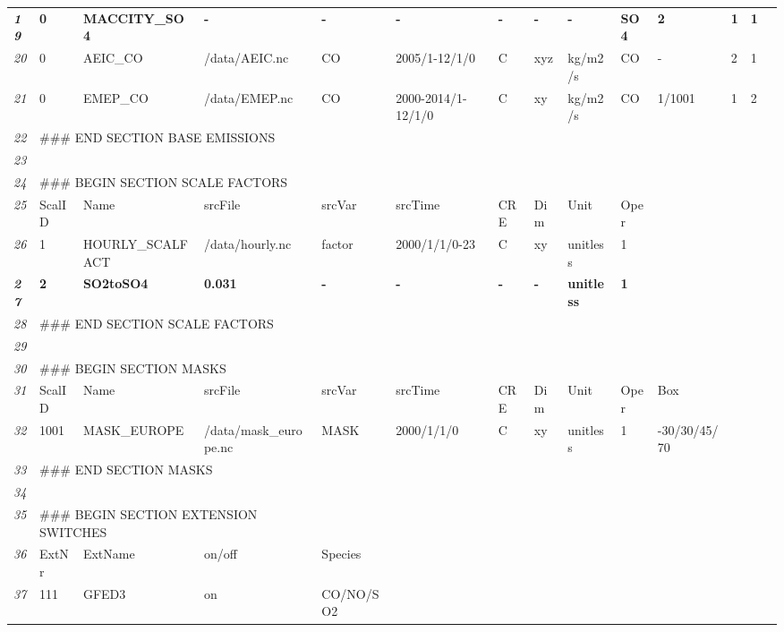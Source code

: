 \documentclass[12pt,a4paper]{article} %
\begin{document}
\begin{small}
\begin{scriptsize}
\begin{tabular}{l|lllllllllllll}
    \textit{\textbf{19}} & \textbf{0} & \textbf{MACCITY\_SO4} & \textbf{-} & \textbf{-} & \textbf{-} & \textbf{-} & \textbf{-} & \textbf{-} & \textbf{SO4} & \textbf{2} & \textbf{1} & \textbf{1} \\
    \textit{20} & 0 & AEIC\_CO & /data/AEIC.nc & CO & 2005/1-12/1/0 & C & xyz & kg/m2/s & CO & - & 2 & 1 \\
    \textit{21} & 0 & EMEP\_CO & /data/EMEP.nc & CO & 2000-2014/1-12/1/0 & C & xy & kg/m2/s & CO & 1/1001 & 1 & 2 \\
    \textit{22} & \multicolumn{3}{l}{\#\#\# END SECTION BASE EMISSIONS} & & & & & & & & & & \\  
    \textit{23} & & & & & & & & & & & & &\\
    \textit{24} & \multicolumn{3}{l}{\#\#\# BEGIN SECTION SCALE FACTORS} & & & & & & & & & & \\ 
    \textit{25} & ScalID & Name & srcFile & srcVar & srcTime & CRE & Dim & Unit & Oper & & & \\ 
    \textit{26} & 1 & HOURLY\_SCALFACT   & /data/hourly.nc & factor & 2000/1/1/0-23 & C & xy & unitless & 1 & & & \\
    \textit{\textbf{27}} & \textbf{2} & \textbf{SO2toSO4} & \textbf{0.031} & \textbf{-} & \textbf{-} & \textbf{-} & \textbf{-} & \textbf{unitless} & \textbf{1} & & & \\
    \textit{28} & \multicolumn{3}{l}{\#\#\# END SECTION SCALE FACTORS} & & & & & & & & & & \\
    \textit{29} & & & & & & & & & & & & & \\
    \textit{30} & \multicolumn{3}{l}{\#\#\# BEGIN SECTION MASKS} & & & & & & & & & & \\
    \textit{31} & ScalID & Name & srcFile & srcVar & srcTime & CRE & Dim & Unit & Oper & Box & & \\ 
    \textit{32} & 1001 & MASK\_EUROPE & /data/mask\_europe.nc & MASK & 2000/1/1/0 & C & xy & unitless & 1 & -30/30/45/70 & & \\
    \textit{33} & \multicolumn{3}{l}{\#\#\# END SECTION MASKS} & & & & & & & & & & \\
    \textit{34} & & & & & & & & & & & & & \\
    \textit{35} & \multicolumn{3}{l}{\#\#\# BEGIN SECTION EXTENSION SWITCHES} & & & & & & & & & & \\
    \textit{36} & ExtNr & ExtName & on/off & Species & & & & & & & & \\
    \textit{37} & 111 & GFED3 & on & CO/NO/SO2 & & & & & & & & \\

\end{tabular}
\end{scriptsize}
\end{small}
\end{document}
